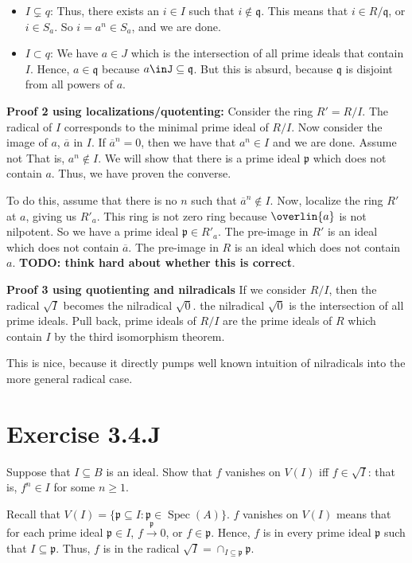 \documentclass{book}
\newcommand{\Spec}{\operatorname{Spec}}
\newcommand{\p}{\mathfrak{p}}
\newcommand{\q}{\mathfrak{q}}
\newcommand{\rad}{\sqrt} %
\theoremstyle{definition}
\begin{document}
\begin{itemize}
\item $I \subsetneq q$: Thus, there exists an $i \in I$ such that $i \not \in \q$.
 This means that $i \in R/\q$, or $i \in S_a$. So $i = a^n \in S_a$, and we
 are done.

\item $I \subset q$: We have $a \in J$ which is the intersection of all prime ideals
 that contain $I$. Hence, $a \in \q$  because $a \inJ \subseteq \q$. But this
 is absurd, because $\q$ is disjoint from all powers of $a$.
\end{itemize}

\textbf{Proof 2 using localizations/quotenting:} 
Consider the ring $R' = R/I$. The radical of $I$ corresponds to the 
minimal prime ideal of $R/I$. Now consider the image of $a$, $\overline{a}$
in $I$.  If $\overline{a}^n = 0$, then we have that $a^n \in I$ and we are done.
Assume not That is, $a^n \not \in I$. We will show that there is a prime
ideal $\p$ which does not contain $a$. Thus, we have proven the converse.

To do this, assume that there is no $n$ such that $\overline{a}^n \not \in I$.
Now, localize the ring $R'$ at $a$, giving us $R'_a$. This ring
is not zero ring because $\overlin{a}$ is not nilpotent.
So we have a prime ideal $\p \in R'_a$. The pre-image in $R'$ is
an ideal which does not contain $\overline{a}$. The pre-image in $R$
is an ideal which does not contain $a$. 
\textbf{TODO: think hard about whether this is correct}.

\textbf{Proof 3 using quotienting and nilradicals}
If we consider $R/I$, then the radical $\rad{I}$ becomes the nilradical
$\rad{0}$. the nilradical $\rad{0}$ is the intersection of all prime ideals.
Pull back, prime ideals of $R/I$ are the prime ideals of $R$ which contain $I$
by the third isomorphism theorem.

This is nice, because it directly pumps well known intuition of nilradicals
into the more general radical case.


\section{Exercise 3.4.J}
Suppose that $I \subseteq B$ is an ideal. Show that $f$ vanishes on $V(I)$
iff $f \in \sqrt{I}$: that is, $f^n \in I$ for some $n \geq 1$.

Recall that $V(I) = \{ \p \subseteq I : \p \in \Spec(A) \}$.
$f$ vanishes on $V(I)$ means that for each prime ideal $\p \in I$,
$f \xrightarrow{\p} 0$, or $f \in \p$. Hence, $f$ is in every prime ideal
$\p$ such that $I \subseteq \p$. Thus, $f$ is in the radical
$\rad I = \cap_{I \subseteq \p} \p$.
\end{document}
